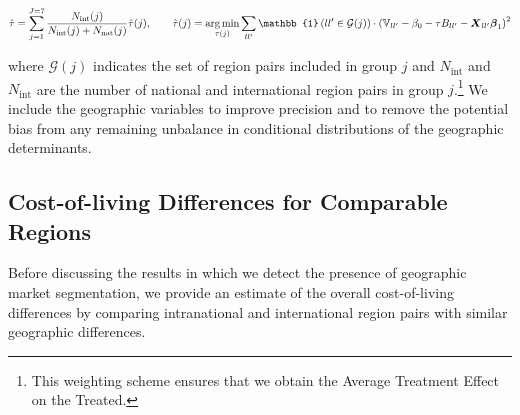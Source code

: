 \begin{linenomath*}
    \begin{equation}\label{eq:att_subclass}
        \hat{\tau} = \sum_{j = 1}^{J = 7} \frac{N_{\text{int}}(j)}{N_{\text{int}}(j) + N_{\text{nat}}(j)}\hat{\tau}(j), \qquad 
        \hat{\tau}(j) = 
            \argmin_{\tau(j)}
            \sum_{ll'}\mathbb{1}
            \left(ll' \in \mathcal{G}(j)\right)\cdot
            \left(\mathbb{V}_{ll'} - \beta_0 - \tau B_{ll'} - \boldsymbol{X}_{ll'}\boldsymbol{\beta}_1\right)^2
    \end{equation}
\end{linenomath*}

\noindent where $\mathcal{G}(j)$ indicates the set of region pairs included in group $j$ and $N_{\text{int}}$ and $N_{\text{int}}$ are the number of national and international region pairs in group $j$.\footnote{This weighting scheme ensures that we obtain the Average Treatment Effect on the Treated.} We include the geographic variables to improve precision and to remove the potential bias from any remaining unbalance in conditional distributions of the geographic determinants. 

\subsection{Cost-of-living Differences for Comparable Regions}
Before discussing the results in which we detect the presence of geographic market segmentation, we provide an estimate of the overall cost-of-living differences by comparing intranational and international region pairs with similar geographic differences.

